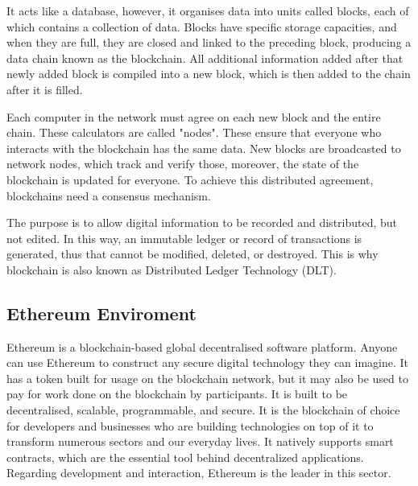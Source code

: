 \documentclass[a4paper,sigconf, language=french,
language=german, language=spanish, language=english]{acmart}
\begin{document}
It acts like a database, however, it organises data into units called blocks, each of which contains a collection of data.
Blocks have specific storage capacities, and when they are full, they are closed and linked to the preceding block, producing a data chain known as the blockchain.
All additional information added after that newly added block is compiled into a new block, which is then added to the chain after it is filled.  

Each computer in the network must agree on each new block and the entire chain. 
These calculators are called "nodes". These ensure that everyone who interacts with the blockchain has the same data. 
New blocks are broadcasted to network nodes, which track and verify those, moreover, the state of the blockchain is updated for everyone.
To achieve this distributed agreement, blockchains need a consensus mechanism. 

The purpose is to allow digital information to be recorded and distributed, but not edited. 
In this way, an immutable ledger or record of transactions is generated, thus that cannot be modified, deleted, or destroyed. 
This is why blockchain is also known as Distributed Ledger Technology (DLT). 


\subsection{Ethereum Enviroment}

Ethereum is a blockchain-based global decentralised software platform. 
Anyone can use Ethereum to construct any secure digital technology they can imagine.
It has a token built for usage on the blockchain network, but it may also be used to pay for work done on the blockchain by participants. 
It is built to be decentralised, scalable, programmable, and secure. It is the blockchain of choice for developers and businesses who are building technologies on top of it to transform numerous sectors and our everyday lives.
It natively supports smart contracts, which are the essential tool behind decentralized applications. Regarding development and interaction, Ethereum is the leader in this sector. 
\end{document}
